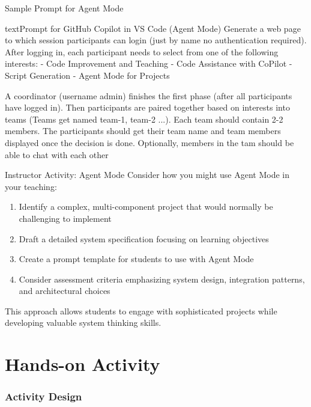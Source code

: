 \documentclass[xcolor={dvipsnames}, aspectratio=169]{beamer}
\begin{document}
\begin{frame}[fragile]{Sample Prompt for Agent Mode}
  \begin{codeboxtc}{text}{Prompt for GitHub Copilot in VS Code (Agent Mode)}{}{}
Generate a web page to which session participants can login (just by name no authentication required). After logging in, each participant needs to select from one of the following interests:
- Code Improvement and Teaching
- Code Assistance with CoPilot
- Script Generation
- Agent Mode for Projects

A coordinator (username admin) finishes the first phase (after all participants have logged in). Then participants are paired together based on interests into teams (Teams get named team-1, team-2 ...). Each team should contain 2-2 members. The participants should get their team name and team members displayed once the decision is done. Optionally, members in the tam should be able to chat with each other
  \end{codeboxtc}
\end{frame}

\begin{frame}{Instructor Activity: Agent Mode}
  Consider how you might use Agent Mode in your teaching:
  
  \begin{enumerate}
    \item Identify a complex, multi-component project that would normally be challenging to implement
    \item Draft a detailed system specification focusing on learning objectives
    \item Create a prompt template for students to use with Agent Mode
    \item Consider assessment criteria emphasizing system design, integration patterns, and architectural choices
  \end{enumerate}
  
  This approach allows students to engage with sophisticated projects while developing valuable system thinking skills.
\end{frame}

\part[Hands-on Activity]{Hands-on Activity}
\section{Activity Design}
\end{document}
